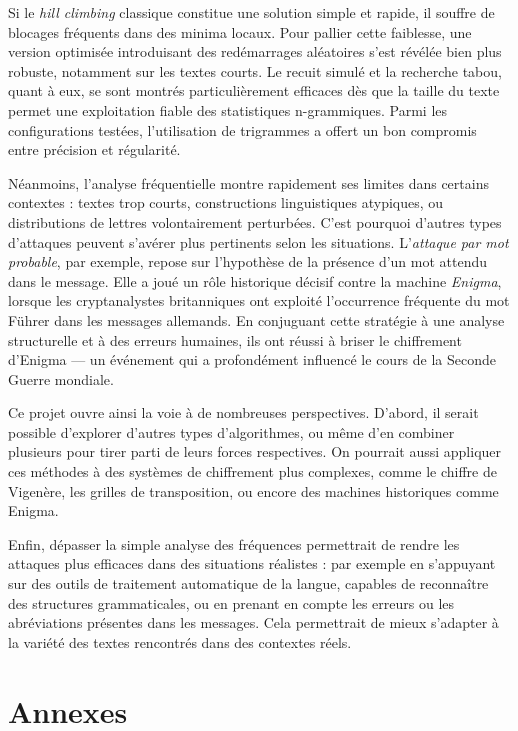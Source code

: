 \documentclass[a4paper]{article}
\begin{document}
Si le \textit{hill climbing} classique constitue une solution simple et rapide, il souffre de blocages fréquents dans des minima locaux. Pour pallier cette faiblesse, une version optimisée introduisant des redémarrages aléatoires s’est révélée bien plus robuste, notamment sur les textes courts. Le recuit simulé et la recherche tabou, quant à eux, se sont montrés particulièrement efficaces dès que la taille du texte permet une exploitation fiable des statistiques n-grammiques. Parmi les configurations testées, l’utilisation de trigrammes a offert un bon compromis entre précision et régularité.

Néanmoins, l’analyse fréquentielle montre rapidement ses limites dans certains contextes : textes trop courts, constructions linguistiques atypiques, ou distributions de lettres volontairement perturbées. C’est pourquoi d’autres types d’attaques peuvent s’avérer plus pertinents selon les situations. L’\textit{attaque par mot probable}, par exemple, repose sur l’hypothèse de la présence d’un mot attendu dans le message. Elle a joué un rôle historique décisif contre la machine \textit{Enigma}, lorsque les cryptanalystes britanniques ont exploité l’occurrence fréquente du mot \og Führer \fg{} dans les messages allemands. En conjuguant cette stratégie à une analyse structurelle et à des erreurs humaines, ils ont réussi à briser le chiffrement d’Enigma — un événement qui a profondément influencé le cours de la Seconde Guerre mondiale.

Ce projet ouvre ainsi la voie à de nombreuses perspectives. D’abord, il serait possible d’explorer d’autres types d’algorithmes, ou même d’en combiner plusieurs pour tirer parti de leurs forces respectives. On pourrait aussi appliquer ces méthodes à des systèmes de chiffrement plus complexes, comme le chiffre de Vigenère, les grilles de transposition, ou encore des machines historiques comme Enigma.

Enfin, dépasser la simple analyse des fréquences permettrait de rendre les attaques plus efficaces dans des situations réalistes : par exemple en s’appuyant sur des outils de traitement automatique de la langue, capables de reconnaître des structures grammaticales, ou en prenant en compte les erreurs ou les abréviations présentes dans les messages. Cela permettrait de mieux s’adapter à la variété des textes rencontrés dans des contextes réels.


\clearpage
\section*{Annexes}
\end{document}
